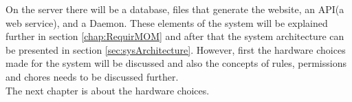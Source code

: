 On the server there will be a database, files that generate the website, an API(a web service), and a Daemon. These elements of the system will be explained further in section \vref{chap:RequirMOM} and after that the system architecture can be presented in section \vref{sec:sysArchitecture}. However, first the hardware choices made for the system will be discussed and also the concepts of rules, permissions and chores needs to be discussed further.\\
The next chapter is about the hardware choices.